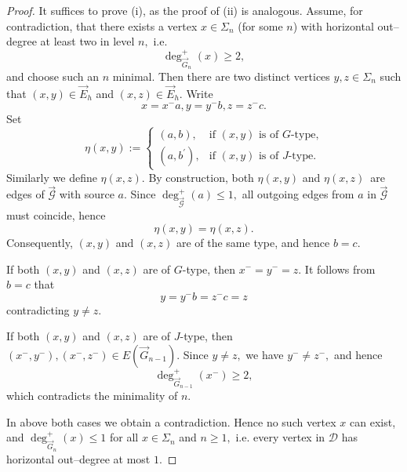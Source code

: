 \documentclass[reqno]{amsart}
\theoremstyle{plain}
\numberwithin{equation}{section}
\begin{document}
\begin{proof}
It suffices to prove (i), as the proof of (ii) is analogous. Assume, for
contradiction, that there exists a vertex $x\in \Sigma _{n}$ (for some $n$)
with horizontal out--degree at least two in level $n,$ i.e. 
\begin{equation*}
\deg _{\overrightarrow{G}_{n}}^{+}(x)\geq 2,
\end{equation*}%
and choose such an $n$ minimal. Then there are two distinct vertices $y,z\in
\Sigma _{n}$ such that $(x,y)\in \vec{E}_{h}$ and $(x,z)\in \vec{E}_{h}$.
Write 
\begin{equation*}
x=x^{-}a,y=y^{-}b,z=z^{-}c.
\end{equation*}%
Set 
\begin{equation*}
\eta (x,y):=\left\{ 
\begin{array}{cc}
(a,b), & \text{if }(x,y)\text{ is of }G\text{-type,} \\ 
(a,b^{\prime }), & \text{if }(x,y)\text{ is of }J\text{-type.}%
\end{array}%
\right.
\end{equation*}%
Similarly we define $\eta (x,z).$ By construction, both $\eta (x,y)$ and $%
\eta (x,z)$\ are edges of $\overrightarrow{\mathcal{G}}$ with source $a$.
Since $\deg _{\overrightarrow{\mathcal{G}}}^{+}(a)\leq 1,$ all outgoing
edges from $a$ in $\overrightarrow{\mathcal{G}}$ must coincide, hence 
\begin{equation*}
\eta (x,y)=\eta (x,z).
\end{equation*}%
Consequently, $(x,y)$ and $(x,z)$ are of the same type, and hence $b=c.$

If both $(x,y)$ and $(x,z)$ are of $G$-type, then $x^{-}=y^{-}=z.$ It
follows from $b=c$ that 
\begin{equation*}
y=y^{-}b=z^{-}c=z
\end{equation*}%
contradicting $y\neq z.$

If both $(x,y)$ and $(x,z)$ are of $J$-type, then $%
(x^{-},y^{-}),(x^{-},z^{-})\in E(\overrightarrow{G}_{n-1}).$ Since $y\neq z,$
we have $y^{-}\neq z^{-},$ and hence 
\begin{equation*}
\deg _{\overrightarrow{G}_{n-1}}^{+}(x^{-})\geq 2,
\end{equation*}%
which contradicts the minimality of $n$.

In above both cases we obtain a contradiction. Hence no such vertex $x$ can
exist, and $\deg _{\overrightarrow{G}_{n}}^{+}(x)\leq 1$ for all $x\in
\Sigma _{n}$ and $n\geq 1,$ i.e. every vertex in $\mathcal{D}$ has
horizontal out--degree at most $1$.
\end{proof}
\end{document}
